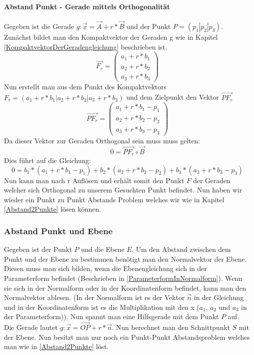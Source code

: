 \documentclass{article}
\begin{document}
\paragraph{Abstand Punkt - Gerade mittels Orthogonalität}
Gegeben ist die Gerade $g : \vec{x} = \vec{A} + r * \vec{B}$ und der Punkt $P = (p_1 | p_2 | p_3)$. Zunächst bildet man den Kompaktvektor der Geraden g wie in Kapitel \ref{KompaktvektorDerGeradengleichung} beschrieben ist.
\begin{equation}
\vec{F_r} = \begin{pmatrix} a_1 + r * b_1 \\ a_2 + r * b_2 \\ a_3 + r * b_3 \end{pmatrix}
\end{equation}
Nun erstellt man aus dem Punkt des Kompaktvektors $F_r = (a_1 + r * b_1 | a_2 + r * b_2 | a_3 + r * b_3)$ und dem Zielpunkt den Vektor $\vec{PF_r}$
\begin{equation}
\vec{PF_r} = \begin{pmatrix}
a_1 + r * b_1 - p_1 \\
a_2 + r * b_2 - p_2 \\
a_3 + r * b_3 - p_3
\end{pmatrix}
\end{equation}
Da dieser Vektor zur Geraden Orthogonal sein muss muss gelten:
\begin{equation}
0 = \vec{PF_r} \circ \vec{B}
\end{equation}
Dies führt auf die Gleichung:
\begin{equation}
0 =  b_1 * (a_1 + r * b_1 - p_1) + b_2 * (a_2 + r * b_2 - p_2) + b_3 * (a_3 + r * b_3 - p_3)
\end{equation}
Nun kann man nach r Auflösen und erhält somit den Punkt $F$ der Geraden welcher sich Orthogonal zu unserem Gesuchten Punkt befindet. Nun haben wir wieder ein Punkt zu Punkt Abstands Problem welches wir wie in Kapitel \ref{Abstand2Punkte} lösen können. 

\subsubsection{Abstand Punkt und Ebene} \label{PunktEbeneAbstand}
Gegeben ist der Punkt $P$ und die Ebene $E$. Um den Abstand zwischen dem Punkt und der Ebene zu bestimmen benötigt man den Normalvektor der Ebene. Diesen muss man sich bilden, wenn die Ebenengleichung sich in der Parameterform befindet (Beschrieben in \ref{ParameterformInNormalform}). Wenn sie sich in der Normalform oder in der Koordinatenform befindet, kann man den Normalvektor ablesen. (In der Normalform ist es der Vektor $\vec{n}$ in der Gleichung und in der Koordinatenform ist es die Multiplikation mit den x ($a_1$, $a_2$ und $a_3$ in der Parameterform)). Nun spannt man eine Hilfsgerade mit dem Punkt $P$ auf. Die Gerade lautet $g : \vec{x} = \vec{OP} + r * \vec{n}$. Nun berechnet man den Schnittpunkt $S$ mit der Ebene. Nun besitzt man nur noch ein Punkt-Punkt Abstandsproblem welches man wie in \ref{Abstand2Punkte} löst.
\end{document}
